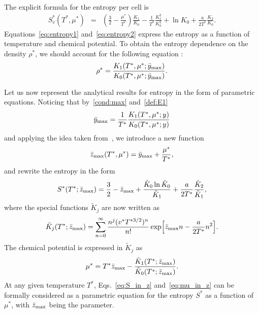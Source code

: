\documentclass[entropy,article,submit,pdftex,moreauthors]{Definitions/mdpi}
\begin{document}
The explicit formula for the entropy per cell is
\begin{eqnarray}
	\label{eq:entropy2}
	S^{*}_v(T^*,\mu^*) & = & \left(\frac{3}{2} - \frac{\mu^*}{T^*}\right)\frac{K_1}{K_0} - \frac{1}{T^*}\frac{K_1^2}{K_0^2} + \ln K_0 + \frac{a}{2T^*} \frac{K_2}{K_0}.
\end{eqnarray}
Equations~\eqref{eq:entropy1} and~\eqref{eq:entropy2} express the entropy as a function of temperature and chemical potential. To obtain the entropy dependence on the density $\rho^*$, we should account for the following equation \citep[(42)]{RDKPS25arxiv}:
\begin{equation}
	\label{eq:rho_in_y}
	\rho^*=\frac{K_1(T^*,\mu^*;\bar{y}_{\rm max})}{K_0(T^*,\mu^*;\bar{y}_{\rm max})}.
\end{equation}

Let us now represent the analytical results for entropy in the form of parametric equations. Noticing that by~\eqref{cond:max} and~\eqref{def:E1}
\begin{equation}
	\bar{y}_{\rm max} = \frac{1}{T^*}\frac{K_1(T^*,\mu^*;y)}{K_0(T^*,\mu^*;y)}
\end{equation}
and applying the idea taken from~\citep{KD22}, we introduce a new function
\begin{equation}
	\bar{z}_{\rm max}(T^*,\mu^*) = \bar{y}_{\rm max} + \frac{\mu^*}{T^*},
\end{equation}
and rewrite the entropy in the form
\begin{equation}
	\label{eq:S_in_z}
	S^*(T^*;\bar{z}_{\rm max}) = \frac{3}{2} - \bar{z}_{\rm max} + \frac{\tilde{K}_0 \ln \tilde{K}_0}{\tilde{K}_1} + \frac{a}{2T^*} \frac{\tilde{K}_2}{\tilde{K}_1},
\end{equation}
where the special functions $\tilde{K}_j$ are now written as
\begin{equation}
	\tilde{K}_j(T^*;\bar{z}_{\rm max}) = \sum_{n=0}^{\infty} \frac{n^j (v^* T^{*3/2})^n}{n!} \exp[\bar{z}_{\rm max}n - \frac{a}{2T^*}n^2].
\end{equation}
The chemical potential is expressed in $\tilde{K}_j$ as
\begin{equation}
	\label{eq:mu_in_z}
	\mu^* = T^* \bar{z}_{\rm max} - \frac{\tilde{K}_1(T^*;\bar{z}_{\rm max})}{\tilde{K}_0(T^*;\bar{z}_{\rm max})}.
\end{equation}
At any given temperature $T^*$, Eqs.~\eqref{eq:S_in_z} and~\eqref{eq:mu_in_z} can be formally considered as a parametric equation for the entropy $S^*$ as a function of $\mu^*$, with $\bar{z}_{\rm max}$ being the parameter.
\end{document}
